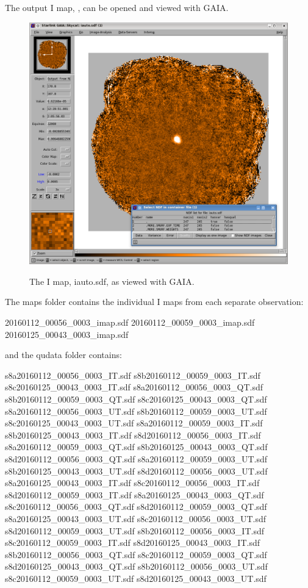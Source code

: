 The output I map, , can be opened and viewed with GAIA.

\begin{figure}[t!]
\begin{center}
\includegraphics[width=0.8\linewidth]{sc22-gaia-view-iauto.png}
\label{fig:gaia-iauto}
\caption [I map in GAIA]{
  \small The I map, iauto.sdf, as viewed with GAIA.
}
\end{center}
\end{figure}

The maps folder contains the individual I maps from each separate
observation:

\begin{terminalv}
20160112_00056_0003_imap.sdf  20160112_00059_0003_imap.sdf  20160125_00043_0003_imap.sdf
\end{terminalv}

and the qudata folder contains:

\begin{terminalv}
s8a20160112_00056_0003_IT.sdf  s8b20160112_00059_0003_IT.sdf  s8c20160125_00043_0003_IT.sdf
s8a20160112_00056_0003_QT.sdf  s8b20160112_00059_0003_QT.sdf  s8c20160125_00043_0003_QT.sdf
s8a20160112_00056_0003_UT.sdf  s8b20160112_00059_0003_UT.sdf  s8c20160125_00043_0003_UT.sdf
s8a20160112_00059_0003_IT.sdf  s8b20160125_00043_0003_IT.sdf  s8d20160112_00056_0003_IT.sdf
s8a20160112_00059_0003_QT.sdf  s8b20160125_00043_0003_QT.sdf  s8d20160112_00056_0003_QT.sdf
s8a20160112_00059_0003_UT.sdf  s8b20160125_00043_0003_UT.sdf  s8d20160112_00056_0003_UT.sdf
s8a20160125_00043_0003_IT.sdf  s8c20160112_00056_0003_IT.sdf  s8d20160112_00059_0003_IT.sdf
s8a20160125_00043_0003_QT.sdf  s8c20160112_00056_0003_QT.sdf  s8d20160112_00059_0003_QT.sdf
s8a20160125_00043_0003_UT.sdf  s8c20160112_00056_0003_UT.sdf  s8d20160112_00059_0003_UT.sdf
s8b20160112_00056_0003_IT.sdf  s8c20160112_00059_0003_IT.sdf  s8d20160125_00043_0003_IT.sdf
s8b20160112_00056_0003_QT.sdf  s8c20160112_00059_0003_QT.sdf  s8d20160125_00043_0003_QT.sdf
s8b20160112_00056_0003_UT.sdf  s8c20160112_00059_0003_UT.sdf  s8d20160125_00043_0003_UT.sdf
\end{terminalv}


